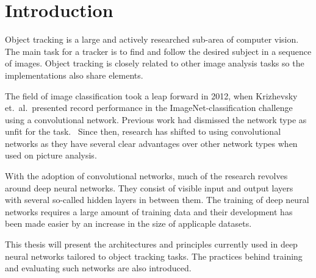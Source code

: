 \section{Introduction}

Object tracking is a large and actively researched sub-area of computer vision. The
main task for a tracker is to find and follow the desired subject in a sequence of
images. Object tracking is closely related to other image analysis tasks so the
implementations also share elements.

The field of image classification took a leap forward in 2012, when
Krizhevsky et.\ al.\ presented record performance in the ImageNet-classification
challenge using a convolutional network. Previous work had dismissed the network
type as unfit for the task.~\cite{NIPS_IMAGENET} Since then, research has shifted
to using convolutional networks as they have several clear advantages over
other network types when used on picture analysis.

With the adoption of convolutional networks, much of the research revolves around
deep neural networks. They consist of visible input and output layers with several
so-called hidden layers in between them. The training of deep neural networks
requires a large amount of training data and their development has been made easier
by an increase in the size of applicaple datasets.

This thesis will present the architectures and principles currently used in deep
neural networks tailored to object tracking tasks. The practices behind training
and evaluating such networks are also introduced.
